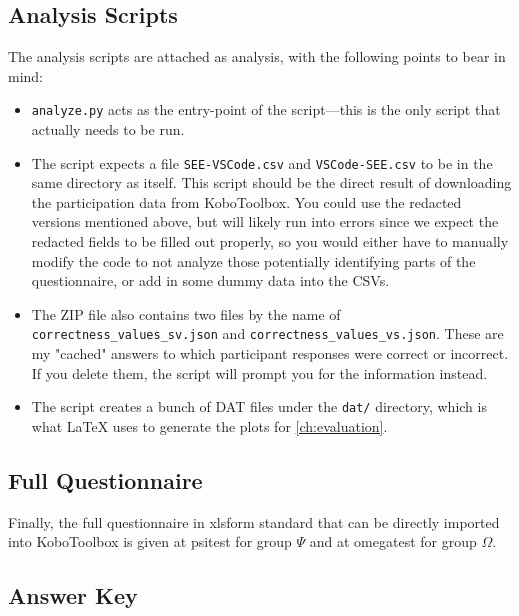 \subsection{Analysis Scripts}
The analysis scripts are attached as \gls{analysis}, with the following points to bear in mind:
\begin{itemize}
	\item \texttt{analyze.py} acts as the entry-point of the script---this is the only script that actually needs to be run.
	\item The script expects a file \texttt{SEE-VSCode.csv} and \texttt{VSCode-SEE.csv} to be in the same directory as itself.
	      This script should be the direct result of downloading the participation data from KoboToolbox.
	      You could use the redacted versions mentioned above, but will likely run into errors since we expect the redacted fields to be filled out properly, so you would either have to manually modify the code to not analyze those potentially identifying parts of the questionnaire, or add in some dummy data into the CSVs.
	\item The ZIP file also contains two files by the name of \texttt{correctness\_values\_sv.json} and \texttt{correctness\_values\_vs.json}.
	      These are my "cached" answers to which participant responses were correct or incorrect.
	      If you delete them, the script will prompt you for the information instead.
	\item The script creates a bunch of DAT files under the \texttt{dat/} directory, which is what \LaTeX{} uses to generate the plots for \cref{ch:evaluation}.
\end{itemize}

\subsection{Full Questionnaire}\label{app:questionnaire}
Finally, the full questionnaire in \gls{xlsform} standard that can be directly imported into KoboToolbox is given at \gls{psitest} for group $\Psi$ and at \gls{omegatest} for group $\Omega$.

\subsection{Answer Key}\label{app:answer}

